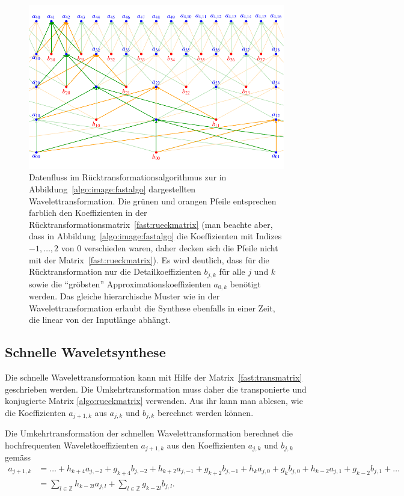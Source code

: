 \begin{figure}
\centering
\includegraphics[width=\hsize]{chapters/7-algo/images/rueckalgo.pdf}
\caption{Datenfluss im Rücktransformationsalgorithmus zur in
Abbildung~\ref{algo:image:fastalgo} dargestellten Wavelettransformation.
Die grünen und orangen Pfeile entsprechen farblich den Koeffizienten
in der Rücktransformationsmatrix~\eqref{fast:rueckmatrix} (man beachte
aber, dass in Abbildung~\ref{algo:image:fastalgo} die Koeffizienten mit
Indizes $-1,\dots,2$ von $0$ verschieden waren, daher decken sich die
Pfeile nicht mit der Matrix~\eqref{fast:rueckmatrix}).
Es wird deutlich, dass für die Rücktransformation nur die Detailkoeffizienten
$b_{j,k}$ für alle $j$ und $k$
sowie die ``gröbsten'' Approximationskoeffizienten $a_{0,k}$ benötigt werden.
Das gleiche hierarchische Muster wie in der Wavelettransformation erlaubt
die Synthese ebenfalls in einer Zeit, die linear von der Inputlänge
abhängt.
\label{fast:rueckfluss}}
\end{figure}

\subsection{Schnelle Waveletsynthese}
Die schnelle Wavelettransformation kann mit Hilfe der
Matrix~\eqref{fast:transmatrix}
geschrieben werden.
Die Umkehrtransformation muss daher die transponierte und konjugierte Matrix
\eqref{algo:rueckmatrix} verwenden.
Aus ihr kann man ablesen, wie die Koeffizienten $a_{j+1,k}$ aus $a_{j,k}$
und $b_{j,k}$ berechnet werden können.

\begin{satz}
Die Umkehrtransformation der schnellen Wavelettransformation berechnet die
hochfrequenten Waveletkoeffizienten $a_{j+1,k}$ aus den Koeffizienten
$a_{j,k}$ und $b_{j,k}$ gemäss
\begin{equation}
\begin{aligned}
a_{j+1,k}
&=
\dots
+
h_{k+4}
a_{j,-2}
+
g_{k+4}
b_{j,-2}
+
h_{k+2}
a_{j,-1}
+
g_{k+2}
b_{j,-1}
+
h_{k}
a_{j,0}
+
g_{k}
b_{j,0}
+
h_{k-2}
a_{j,1}
+
g_{k-2}
b_{j,1}
+
\dots
\\
&=
\sum_{l\in\mathbb Z}
h_{k-2l}
a_{j,l}
+
\sum_{l\in\mathbb Z}
g_{k-2l}
b_{j,l}.
\end{aligned}
\end{equation}
\end{satz}

